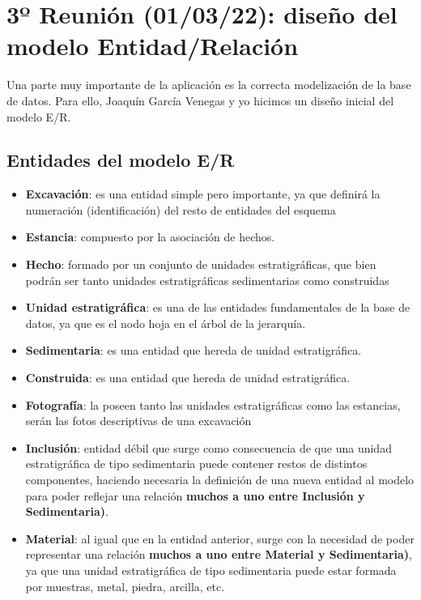 \section{3º Reunión (01/03/22): diseño del modelo Entidad/Relación}
Una parte muy importante de la aplicación es la correcta modelización de la base de datos.
Para ello, Joaquín García Venegas y yo hicimos un diseño inicial del modelo E/R.

    \subsection{Entidades del modelo E/R}

        \begin{itemize}
            \item \textbf{Excavación}: es una entidad simple pero importante, ya que definirá
            la numeración (identificación) del resto de entidades del esquema 
            \item \textbf{Estancia}: compuesto por la asociación de hechos.
            \item \textbf{Hecho}: formado por un conjunto de unidades estratigráficas, que
            bien podrán ser tanto unidades estratigráficas sedimentarias como construidas 
            \item \textbf{Unidad estratigráfica}: es una de las entidades fundamentales de
            la base de datos, ya que es el nodo hoja en el árbol de la jerarquía.
            \item \textbf{Sedimentaria}: es una entidad que hereda de unidad estratigráfica.
            \item \textbf{Construida}: es una entidad que hereda de unidad estratigráfica.
            \item \textbf{Fotografía}: la poseen tanto las unidades estratigráficas como las
            estancias, serán las fotos descriptivas de una excavación
            \item \textbf{Inclusión}: entidad débil que surge como consecuencia de que una
            unidad estratigráfica de tipo sedimentaria puede contener restos de distintos
            componentes, haciendo necesaria la definición de una nueva entidad al modelo
            para poder reflejar una relación \textbf{muchos a uno entre Inclusión y
            Sedimentaria)}.
            \item \textbf{Material}: al igual que en la entidad anterior, surge con la
            necesidad de poder representar una relación \textbf{muchos a uno entre Material
            y Sedimentaria)}, ya que una unidad estratigráfica de tipo sedimentaria puede
            estar formada por muestras, metal, piedra, arcilla, etc.
        \end{itemize}


